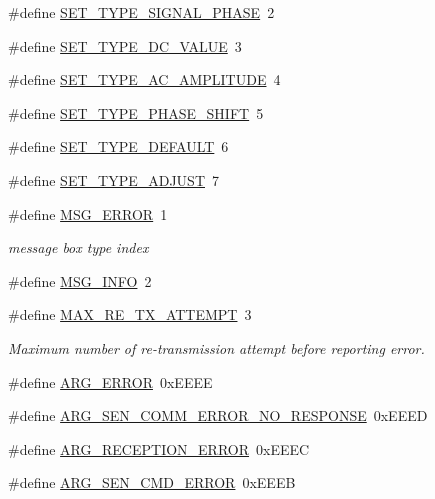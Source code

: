 \begin{DoxyCompactItemize}
\#define \hyperlink{a00034_a45f9851d4938b1ce68a1aad58d8776cc}{S\+E\+T\+\_\+\+T\+Y\+P\+E\+\_\+\+S\+I\+G\+N\+A\+L\+\_\+\+P\+H\+A\+S\+E}~2
\item 
\#define \hyperlink{a00034_a347f6ec80828b93988d22989c0df015f}{S\+E\+T\+\_\+\+T\+Y\+P\+E\+\_\+\+D\+C\+\_\+\+V\+A\+L\+U\+E}~3
\item 
\#define \hyperlink{a00034_a704f34d2cc6c149f96e9da9d2a1aa8c0}{S\+E\+T\+\_\+\+T\+Y\+P\+E\+\_\+\+A\+C\+\_\+\+A\+M\+P\+L\+I\+T\+U\+D\+E}~4
\item 
\#define \hyperlink{a00034_ada31d976cd5e22a05ba8ff5e80c16d06}{S\+E\+T\+\_\+\+T\+Y\+P\+E\+\_\+\+P\+H\+A\+S\+E\+\_\+\+S\+H\+I\+F\+T}~5
\item 
\#define \hyperlink{a00034_afd1036bf6329d2ac31913e14c1f56725}{S\+E\+T\+\_\+\+T\+Y\+P\+E\+\_\+\+D\+E\+F\+A\+U\+L\+T}~6
\item 
\#define \hyperlink{a00034_a16b6b7b5ad68ec0dd62a3c9e97f88adb}{S\+E\+T\+\_\+\+T\+Y\+P\+E\+\_\+\+A\+D\+J\+U\+S\+T}~7
\item 
\#define \hyperlink{a00034_aa8a990825a5a62c89d2fb8b08d8a1070}{M\+S\+G\+\_\+\+E\+R\+R\+O\+R}~1
\begin{DoxyCompactList}\small\item\em message box type index \end{DoxyCompactList}\item 
\#define \hyperlink{a00034_a1ddcc97224a95cec04b38b0ac866fa19}{M\+S\+G\+\_\+\+I\+N\+F\+O}~2
\item 
\#define \hyperlink{a00034_ae024113875b4670b57f70611ff982543}{M\+A\+X\+\_\+\+R\+E\+\_\+\+T\+X\+\_\+\+A\+T\+T\+E\+M\+P\+T}~3
\begin{DoxyCompactList}\small\item\em Maximum number of re-\/transmission attempt before reporting error. \end{DoxyCompactList}\item 
\#define \hyperlink{a00034_a098c8517207326db0313f33ac7c6fdd8}{A\+R\+G\+\_\+\+E\+R\+R\+O\+R}~0x\+E\+E\+E\+E
\item 
\#define \hyperlink{a00034_a5f745a08fe4d5a8336a8fd62c30e0642}{A\+R\+G\+\_\+\+S\+E\+N\+\_\+\+C\+O\+M\+M\+\_\+\+E\+R\+R\+O\+R\+\_\+\+N\+O\+\_\+\+R\+E\+S\+P\+O\+N\+S\+E}~0x\+E\+E\+E\+D
\item 
\#define \hyperlink{a00034_a6c0eafe3de1c9e7ecff5c4f93db9ab7b}{A\+R\+G\+\_\+\+R\+E\+C\+E\+P\+T\+I\+O\+N\+\_\+\+E\+R\+R\+O\+R}~0x\+E\+E\+E\+C
\item 
\#define \hyperlink{a00034_a9922eac72168ff3c8ee0b273de724049}{A\+R\+G\+\_\+\+S\+E\+N\+\_\+\+C\+M\+D\+\_\+\+E\+R\+R\+O\+R}~0x\+E\+E\+E\+B

\end{DoxyCompactItemize}
